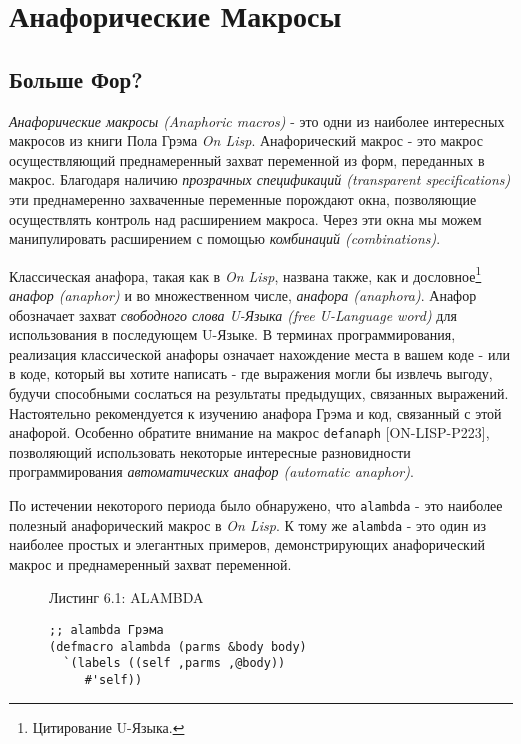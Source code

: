 \chapter{Анафорические Макросы}\label{chapter_anaphoric_macros}
\section{Больше Фор?}\label{section_more_phors?}


\emph{Анафорические макросы (Anaphoric macros)} - это одни из наиболее интересных макросов из книги Пола Грэма \emph{On Lisp}. Анафорический макрос - это макрос осуществляющий преднамеренный захват переменной из форм, переданных в макрос. Благодаря наличию \emph{прозрачных спецификаций (transparent specifications)} эти преднамеренно захваченные переменные порождают окна, позволяющие осуществлять контроль над расширением макроса. Через эти окна мы можем манипулировать расширением с помощью \emph{комбинаций (combinations)}.

Классическая анафора, такая как в \emph{On Lisp}, названа также, как и дословное\footnote{Цитирование U-Языка.} \emph{анафор (anaphor)} и во множественном числе, \emph{анафора (ana\-pho\-ra)}. Анафор обозначает захват \emph{свободного слова U-Языка (free U-Language word)} для использования в последующем U-Языке. В терминах программирования, реализация классической анафоры означает нахождение места в вашем коде - или в коде, который вы хотите написать - где выражения могли бы извлечь выгоду, будучи способными сослаться на результаты предыдущих, связанных выражений. Настоятельно рекомендуется к изучению анафора Грэма и код, связанный с этой анафорой. Особенно обратите внимание на макрос \verb"defanaph" [ON-LISP-P223], позволяющий использовать некоторые интересные разновидности программирования \emph{автоматических анафор (automatic anaphor)}.



По истечении некоторого периода было обнаружено, что \verb"alambda" - это наиболее полезный анафорический макрос в \emph{On Lisp}. К тому же \verb"alambda" - это один из наиболее простых и элегантных примеров, демонстрирующих анафорический макрос и преднамеренный захват переменной.

\begin{figure}Листинг 6.1: ALAMBDA\label{listing_6.1}
\listbegin
\begin{verbatim}
;; alambda Грэма
(defmacro alambda (parms &body body)
  `(labels ((self ,parms ,@body))
     #'self))
\end{verbatim}
\listend
\end{figure}

